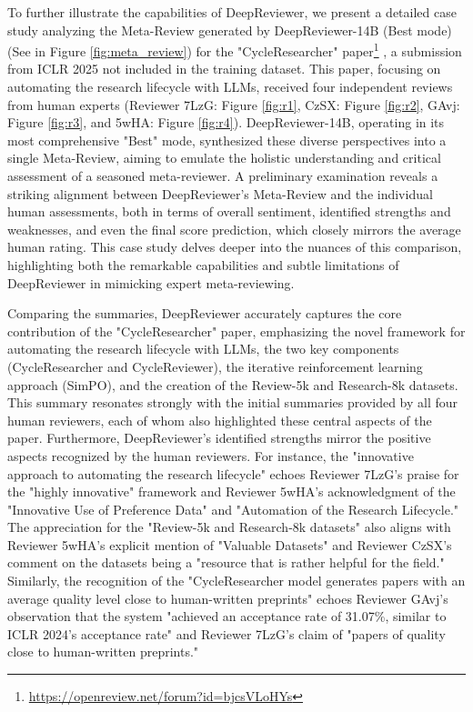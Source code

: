 \documentclass{article}
\begin{document}
To further illustrate the capabilities of DeepReviewer, we present a detailed case study analyzing the Meta-Review generated by DeepReviewer-14B (Best mode) (See in Figure \ref{fig:meta_review}) for the "CycleResearcher" paper\footnote{\url{https://openreview.net/forum?id=bjcsVLoHYs}} \citep{yixuan2024cycleresearcher}, a submission from ICLR 2025 not included in the training dataset. This paper, focusing on automating the research lifecycle with LLMs, received four independent reviews from human experts (Reviewer 7LzG: Figure \ref{fig:r1}, CzSX: Figure \ref{fig:r2}, GAvj: Figure \ref{fig:r3}, and 5wHA: Figure \ref{fig:r4}).  DeepReviewer-14B, operating in its most comprehensive "Best" mode, synthesized these diverse perspectives into a single Meta-Review, aiming to emulate the holistic understanding and critical assessment of a seasoned meta-reviewer.  A preliminary examination reveals a striking alignment between DeepReviewer's Meta-Review and the individual human assessments, both in terms of overall sentiment, identified strengths and weaknesses, and even the final score prediction, which closely mirrors the average human rating. This case study delves deeper into the nuances of this comparison, highlighting both the remarkable capabilities and subtle limitations of DeepReviewer in mimicking expert meta-reviewing.

Comparing the summaries, DeepReviewer accurately captures the core contribution of the "CycleResearcher" paper, emphasizing the novel framework for automating the research lifecycle with LLMs, the two key components (CycleResearcher and CycleReviewer), the iterative reinforcement learning approach (SimPO), and the creation of the Review-5k and Research-8k datasets. This summary resonates strongly with the initial summaries provided by all four human reviewers, each of whom also highlighted these central aspects of the paper.  Furthermore, DeepReviewer's identified strengths mirror the positive aspects recognized by the human reviewers. For instance, the "innovative approach to automating the research lifecycle" echoes Reviewer 7LzG's praise for the "highly innovative" framework and Reviewer 5wHA's acknowledgment of the "Innovative Use of Preference Data" and "Automation of the Research Lifecycle."  The appreciation for the "Review-5k and Research-8k datasets" also aligns with Reviewer 5wHA's explicit mention of "Valuable Datasets" and Reviewer CzSX's comment on the datasets being a "resource that is rather helpful for the field."  Similarly, the recognition of the "CycleResearcher model generates papers with an average quality level close to human-written preprints" echoes Reviewer GAvj's observation that the system "achieved an acceptance rate of 31.07\%, similar to ICLR 2024's acceptance rate" and Reviewer 7LzG’s claim of "papers of quality close to human-written preprints."
\end{document}
